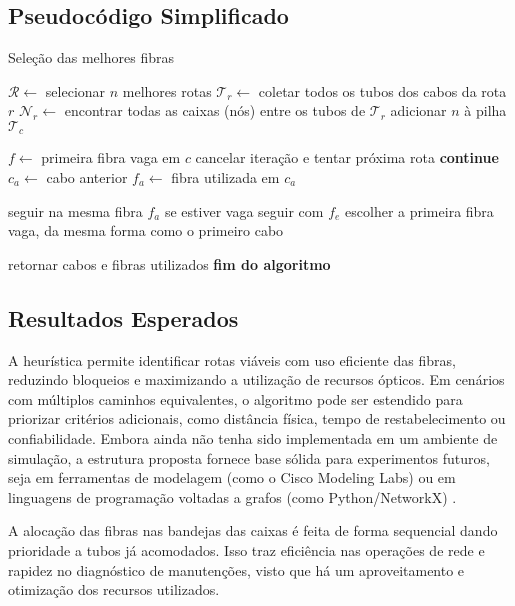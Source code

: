 \subsection{Pseudocódigo Simplificado}

\begin{algorithm}[H]
\caption{Seleção das melhores fibras}
\label{alg:the_alg}
\begin{algorithmic}[1]
\State $\mathcal{R} \gets$ selecionar $n$ melhores rotas
    \State $\mathcal{T}_r \gets$ coletar todos os tubos dos cabos da rota $r$
    \State $\mathcal{N}_r \gets$ encontrar todas as caixas (nós) entre os tubos de $\mathcal{T}_r$
            \State adicionar $n$ à pilha $\mathcal{T}_{c}$
        \EndIf
    \EndFor

            \State $f \gets$ primeira fibra vaga em $c$
                \State cancelar iteração e tentar próxima rota
                \State \textbf{continue}
            \EndIf
        \Else
            \State $c_{a} \gets$ cabo anterior
            \State $f_{a} \gets$ fibra utilizada em $c_{a}$

                \State seguir na mesma fibra $f_{a}$ se estiver vaga
                \State seguir com $f_{e}$
            \Else
                \State escolher a primeira fibra vaga, da mesma forma como o primeiro cabo
            \EndIf
        \EndIf
    \EndFor

    \State retornar cabos e fibras utilizados
\EndFor
\State \textbf{fim do algoritmo}
\end{algorithmic}
\end{algorithm}

\subsection{Resultados Esperados}

A heurística permite identificar rotas viáveis com uso eficiente das fibras,
reduzindo bloqueios e maximizando a utilização de recursos ópticos. Em cenários
com múltiplos caminhos equivalentes, o algoritmo pode ser estendido para
priorizar critérios adicionais, como distância física, tempo de
restabelecimento ou confiabilidade. Embora ainda não tenha sido implementada em
um ambiente de simulação, a estrutura proposta fornece base sólida para
experimentos futuros, seja em ferramentas de modelagem (como o Cisco Modeling
Labs) ou em linguagens de programação voltadas a grafos (como Python/NetworkX) \cite{alwayn2004optical}.

A alocação das fibras nas bandejas das caixas é feita de forma sequencial 
dando prioridade a tubos já acomodados. Isso traz eficiência nas operações de
rede e rapidez no diagnóstico de manutenções, visto que há um aproveitamento e
otimização dos recursos utilizados.

